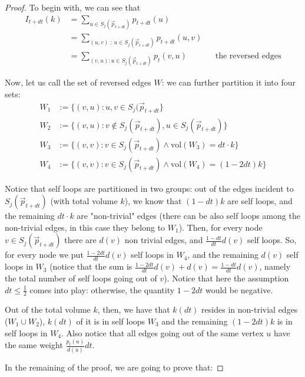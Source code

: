 \documentclass[../main.tex]{subfiles}
\begin{document}
\begin{proof}
    To begin with, we can see that
    \begin{align}
        I_{t+dt}(k) &= \sum_{u\in S_j(\vec{p}_{t+dt})} p_{t+dt}(u) \\
        & = \sum_{(u,v) \text{ : } u \in S_j(\vec{p}_{t+dt})} p_{t+dt}(u,v) \\
        & = \sum_{(v,u): u\in S_j(\vec{p}_{t+dt})} p_t(v, u)  && \text{the reversed edges} \label{eq:I_t_equivalence_probability}
    \end{align}
    
    
    Now, let us call the set of reversed edges $W$: we can further partition it into four sets:
    \begin{align*}
        W_1 & := \{(v, u) : u, v\in S_j(\vec{p}_{t+dt}\} \\
        W_2 & := \{(v, u) : v\notin S_j(\vec{p}_{t+dt}), u\in S_j(\vec{p}_{t+dt}) \} \\
        W_3 & := \{(v, v) : v\in S_j(\vec{p}_{t+dt}) \land \text{vol}(W_3) = dt \cdot k \} \\
        W_4 & := \{(v, v) : v\in S_j(\vec{p}_{t+dt}) \land \text{vol}(W_4) = (1 - 2dt) k\}
    \end{align*}
    
    Notice that self loops are partitioned in two groups: out of the edges incident to $S_j(\vec{p}_{t+dt})$ (with total volume $k$), we know that $(1-dt)k$ are self loops, and the remaining $dt \cdot k$ are "non-trivial" edges (there can be also self loops among the non-trivial edges, in this case they belong to $W_1$). Then, for every node $v \in S_j(\vec{p}_{t+dt})$ there are $d(v)$ non trivial edges, and $\frac{1-dt}{dt}d(v)$ self loops. So, for every node we put $\frac{1-2dt}{dt}d(v)$ self loops in $W_4$, and the remaining $d(v)$ self loops in $W_3$ (notice that the sum is $\frac{1-2dt}{dt}d(v) + d(v) = \frac{1-dt}{dt} d(v)$, namely the total number of self loops going out of $v$). Notice that here the assumption $dt \leq \frac{1}{2}$ comes into play: otherwise, the quantity $1-2dt$ would be negative.
    
    Out of the total volume $k$, then, we have that $k(dt)$ resides in non-trivial edges ($W_1 \cup W_2$), $k(dt)$ of it is in self loops $W_3$ and the remaining $(1-2dt)k$ is in self loops in $W_4$. Also notice that all edges going out of the same vertex $u$ have the same weight $\frac{p_t(u)}{d(u)}dt$.
    
    In the remaining of the proof, we are going to prove that:
    

\end{proof}
\end{document}
